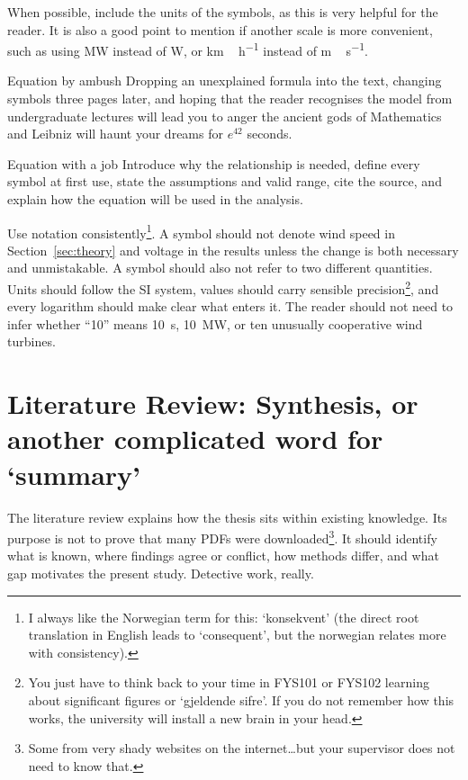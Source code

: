 \documentclass[masters,en,listoffigures,listoftables,acronyms]{NMBU}
\begin{document}
When possible, include the units of the symbols, as this is very helpful for the reader.
It is also a good point to mention if another scale is more convenient, such as using \unit{MW} instead of \unit{W}, or \unit{km\,h^{-1}} instead of \unit{m\,s^{-1}}.

\begin{avoidbox}{Equation by ambush}
Dropping an unexplained formula into the text, changing symbols three pages
later, and hoping that the reader recognises the model from undergraduate
lectures will lead you to anger the ancient gods of Mathematics and Leibniz will haunt your dreams for \(e^{42}\) seconds.
\end{avoidbox}

\begin{betterbox}{Equation with a job}
Introduce why the relationship is needed, define every symbol at first use,
state the assumptions and valid range, cite the source, and explain how the
equation will be used in the analysis.
\end{betterbox}


Use notation consistently\footnote{I always like the Norwegian term for this: `konsekvent' (the direct root translation in English leads to `consequent', but the norwegian relates more with consistency).}.
A symbol should not denote wind speed in Section~\ref{sec:theory} and voltage in the results unless the change is both necessary and unmistakable.
A symbol should also not refer to two different quantities.
Units should follow the SI system, values should carry sensible precision\footnote{You just have to think back to your time in FYS101 or FYS102 learning about significant figures or `gjeldende sifre'. If you do not remember how this works, the university will install a new brain in your head.}, and every logarithm should make clear what enters it.
The reader should not need to infer whether ``10'' means \qty{10}{s},
\qty{10}{MW}, or ten unusually cooperative wind turbines.

\clearpage
\section{Literature Review: Synthesis, or another complicated word for `summary'}
\label{sec:literature}

The literature review explains how the thesis sits within existing knowledge.
Its purpose is not to prove that many PDFs were downloaded\footnote{Some from very shady websites on the internet\dots but your supervisor does not need to know that.}.
It should identify what is known, where findings agree or conflict, how methods differ, and what gap motivates the present study.
Detective work, really.
\end{document}
